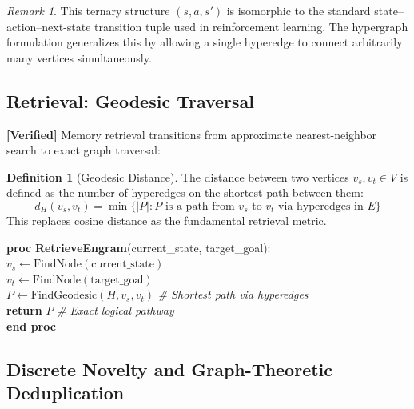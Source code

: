 \documentclass[11pt]{article}
\newcommand{\verified}{\textcolor{verifiedgreen}{\textbf{[Verified]}}}
\theoremstyle{definition}
\newtheorem{definition}{Definition}[section]
\theoremstyle{remark}
\newtheorem{remark}{Remark}[section]
\begin{document}
\begin{remark}
This ternary structure $(s, a, s')$ is isomorphic to the standard
state--action--next-state transition tuple used in reinforcement learning.
The hypergraph formulation generalizes this by allowing a single hyperedge to
connect arbitrarily many vertices simultaneously.
\end{remark}

\subsection{Retrieval: Geodesic Traversal}

\verified{} Memory retrieval transitions from approximate nearest-neighbor
search to exact graph traversal:

\begin{definition}[Geodesic Distance]
\label{def:geodesic}
The distance between two vertices $v_s, v_t \in V$ is defined as the number
of hyperedges on the shortest path between them:
\[
  d_H(v_s, v_t) = \min \big\{ |P| : P \text{ is a path from } v_s
  \text{ to } v_t \text{ via hyperedges in } E \big\}
\]
This replaces cosine distance as the fundamental retrieval metric.
\end{definition}

\begin{pseudocodebox}
\label{alg:retrieve}
\begin{tabbing}
\textbf{proc} \= \textbf{RetrieveEngram}(current\_state, target\_goal): \\
\> $v_s \gets \text{FindNode}(\text{current\_state})$ \\
\> $v_t \gets \text{FindNode}(\text{target\_goal})$ \\
\> $P \gets \text{FindGeodesic}(H, v_s, v_t)$ \hfill\textit{\# Shortest path via hyperedges} \\
\> \textbf{return} $P$ \hfill\textit{\# Exact logical pathway} \\
\textbf{end proc}
\end{tabbing}
\end{pseudocodebox}

\subsection{Discrete Novelty and Graph-Theoretic Deduplication}
\end{document}
